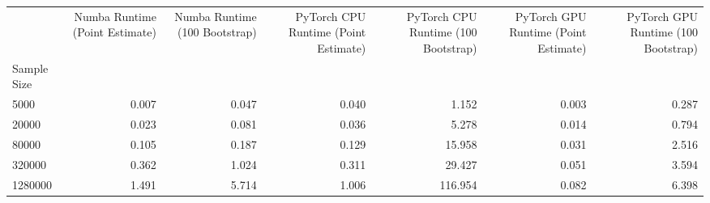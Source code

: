 \begin{tabular}{lrrrrrr}
\toprule
 & Numba Runtime (Point Estimate) & Numba Runtime (100 Bootstrap) & PyTorch CPU Runtime (Point Estimate) & PyTorch CPU Runtime (100 Bootstrap) & PyTorch GPU Runtime (Point Estimate) & PyTorch GPU Runtime (100 Bootstrap) \\
Sample Size &  &  &  &  &  &  \\
\midrule
5000 & 0.007 & 0.047 & 0.040 & 1.152 & 0.003 & 0.287 \\
20000 & 0.023 & 0.081 & 0.036 & 5.278 & 0.014 & 0.794 \\
80000 & 0.105 & 0.187 & 0.129 & 15.958 & 0.031 & 2.516 \\
320000 & 0.362 & 1.024 & 0.311 & 29.427 & 0.051 & 3.594 \\
1280000 & 1.491 & 5.714 & 1.006 & 116.954 & 0.082 & 6.398 \\
\bottomrule
\end{tabular}
